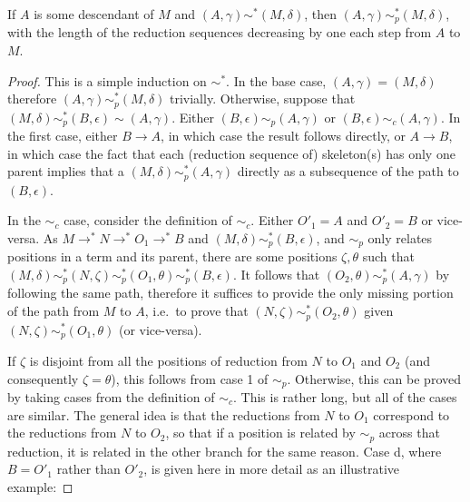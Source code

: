 \begin{lemma} \label{simpDoesn'tMix}
If $A$ is some descendant of $M$ and $(A,\gamma) \sim^* (M,\delta)$, then $(A,\gamma) \sim_p^* (M,\delta)$, with the length of the reduction sequences decreasing by one each step from $A$ to $M$.
\end{lemma}
\begin{proof}
This is a simple induction on $\sim^*$. In the base case, $(A,\gamma) = (M,\delta)$ therefore $(A,\gamma) \sim_p^* (M,\delta)$ trivially. Otherwise, suppose that $(M,\delta) \sim_p^* (B,\epsilon) \sim (A,\gamma)$. Either $(B,\epsilon) \sim_p (A,\gamma)$ or $(B,\epsilon) \sim_c (A,\gamma)$. In the first case, either $B \to A$, in which case the result follows directly, or $A \to B$, in which case the fact that each (reduction sequence of) skeleton(s) has only one parent implies that a $(M,\delta) \sim_p^* (A,\gamma)$ directly as a subsequence of the path to $(B,\epsilon)$.

In the $\sim_c$ case, consider the definition of $\sim_c$. Either $O'_1 = A$ and $O'_2 = B$ or vice-versa. As $M \to^* N \to^* O_1 \to^* B$ and $(M,\delta) \sim_p^* (B,\epsilon)$, and $\sim_p$ only relates positions in a term and its parent, there are some positions $\zeta, \theta$ such that $(M,\delta) \sim_p^* (N,\zeta) \sim_p^* (O_1, \theta) \sim_p^* (B,\epsilon)$. It follows that $(O_2, \theta) \sim_p^* (A,\gamma)$ by following the same path, therefore it suffices to provide the only missing portion of the path from $M$ to $A$, i.e.~to prove that $(N,\zeta) \sim_p^* (O_2,\theta)$ given $(N,\zeta) \sim_p^* (O_1,\theta)$ (or vice-versa).

If $\zeta$ is disjoint from all the positions of reduction from $N$ to $O_1$ and $O_2$ (and consequently $\zeta = \theta$), this follows from case 1 of $\sim_p$. Otherwise, this can be proved by taking cases from the definition of $\sim_c$. This is rather long, but all of the cases are similar. The general idea is that the reductions from $N$ to $O_1$ correspond to the reductions from $N$ to $O_2$, so that if a position is related by $\sim_p$ across that reduction, it is related in the other branch for the same reason. Case d, where $B = O'_1$ rather than $O'_2$, is given here in more detail as an illustrative example:


\end{proof}
